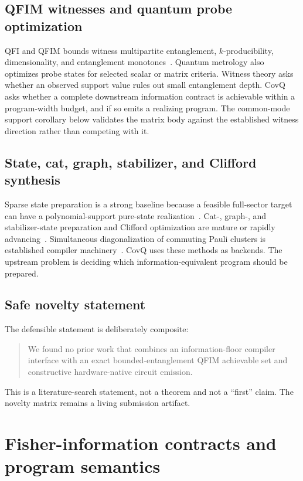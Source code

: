 \documentclass[11pt]{article}
\theoremstyle{definition}
\theoremstyle{remark}
\begin{document}
\subsection{QFIM witnesses and quantum probe optimization}
QFI and QFIM bounds witness multipartite entanglement, $k$-producibility, dimensionality, and entanglement monotones~\cite{HyllusEtAl2012,Toth2012,SzalayToth2025,LiuEtAl2024,DuEtAl2026}. Quantum metrology also optimizes probe states for selected scalar or matrix criteria. Witness theory asks whether an observed support value rules out small entanglement depth. CovQ asks whether a complete downstream information contract is achievable within a program-width budget, and if so emits a realizing program. The common-mode support corollary below validates the matrix body against the established witness direction rather than competing with it.

\subsection{State, cat, graph, stabilizer, and Clifford synthesis}
Sparse state preparation is a strong baseline because a feasible full-sector target can have a polynomial-support pure-state realization~\cite{LuoLi2025,LowKliuchnikovSchaeffer2024}. Cat-, graph-, and stabilizer-state preparation and Clifford optimization are mature or rapidly advancing~\cite{AaronsonGottesman2004,BravyiMaslov2021,KumabeMoriYoshimura2026,SharmaEtAl2026}. Simultaneous diagonalization of commuting Pauli clusters is established compiler machinery~\cite{VanDenBergTemme2020}. CovQ uses these methods as backends. The upstream problem is deciding which information-equivalent program should be prepared.

\subsection{Safe novelty statement}
The defensible statement is deliberately composite:
\begin{quote}
We found no prior work that combines an information-floor compiler interface with an exact bounded-entanglement QFIM achievable set and constructive hardware-native circuit emission.
\end{quote}
This is a literature-search statement, not a theorem and not a ``first'' claim. The novelty matrix remains a living submission artifact.

\section{Fisher-information contracts and program semantics}
\end{document}
